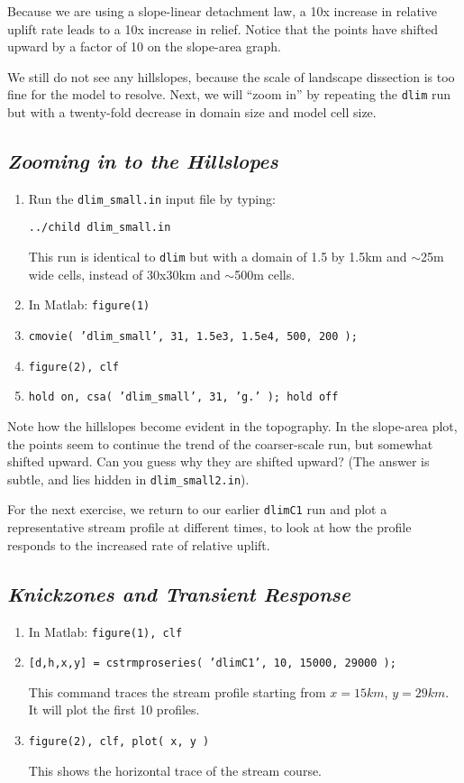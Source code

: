 \documentclass[12pt]{amsart}
\begin{document}
Because we are using a slope-linear detachment law, a 10x increase in relative uplift rate leads to a 10x increase in relief. Notice that the points have shifted upward by a factor of 10 on the slope-area graph.

We still do not see any hillslopes, because the scale of landscape dissection is too fine for the model to resolve. Next, we will ``zoom in'' by repeating the {\tt dlim} run but with a twenty-fold decrease in domain size and model cell size.

\subsection*{\em Zooming in to the Hillslopes}

{ \em
\begin{enumerate}
\item
Run the {\tt dlim\_small.in} input file by typing:

{\tt ../child dlim\_small.in}

This run is identical to {\tt dlim} but with a domain of 1.5 by 1.5km and $\sim$25m wide cells, instead of 30x30km and $\sim$500m cells.
\item
In Matlab: {\tt figure(1)}
\item
{\tt cmovie( 'dlim\_small', 31, 1.5e3, 1.5e4, 500, 200 );}
\item
{\tt figure(2), clf}
\item
{\tt hold on, csa( 'dlim\_small', 31, 'g.' ); hold off}
\end{enumerate}
}

Note how the hillslopes become evident in the topography. In the slope-area plot, the points seem to continue the trend of the coarser-scale run, but somewhat shifted upward. Can you guess why they are shifted upward? (The answer is subtle, and lies hidden in {\tt dlim\_small2.in}).

For the next exercise, we return to our earlier {\tt dlimC1} run and plot a representative stream profile at different times, to look at how the profile responds to the increased rate of relative uplift.

\subsection*{\em Knickzones and Transient Response}

{ \em
\begin{enumerate}
\item
In Matlab: {\tt figure(1), clf}
\item
{\tt [d,h,x,y] = cstrmproseries( 'dlimC1', 10, 15000, 29000 );}

\noindent
This command traces the stream profile starting from $x=15km$, $y=29km$. It will plot the first 10 profiles.
\item
{\tt figure(2), clf, plot( x, y )}

\noindent
This shows the horizontal trace of the stream course.
\end{enumerate}
}
\end{document}
